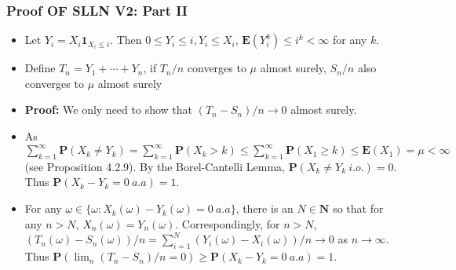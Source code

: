 \documentclass[handout]{beamer}
\newcommand{\BP}{\mathbf{P}}
\newcommand{\BE}{\mathbf{E}}
\newcommand{\BI}{\mathbf{1}}
\begin{document}
\frame
{
  \frametitle{Proof OF SLLN V2: Part II}

   \begin{itemize}
   \item<1-> Let $Y_i=X_i \BI_{X_i\leq i}$. Then $0\leq Y_i\leq i, Y_i\leq X_i$, $\BE(Y_i^k) \leq i^k< \infty$ for any $k$.
   
    \item<2->[]\begin{Lemma} Define $T_n=Y_1+\cdots+Y_n$, if $T_n/n$ converges to $\mu$ almost surely, $S_n/n$ also converges to $\mu$ almost surely \end{Lemma} 
    
    \item<3-> \textbf{Proof:} We only need to show that $(T_n-S_n)/n \rightarrow 0$ almost surely. 
    
         \item<4->[-]  As $\sum_{k=1}^{\infty} \BP(X_k\neq Y_k)=\sum_{k=1}^{\infty} \BP (X_k>k) \leq \sum_{k=1}^{\infty} \BP (X_1\geq k)\leq \BE(X_1)=\mu<\infty$ (see Proposition 4.2.9). By the Borel-Cantelli Lemma, $\BP(X_k\neq Y_k\ i.o.)=0$. Thus $\BP(X_k-Y_k=0\ a.a)=1$.
         
         \item<5->[-]   For any $\omega\in \{\omega: X_k(\omega)-Y_k(\omega)=0\ a.a \}$, there is an $N \in \mathbf{N}$ so that for any $n>N$, $X_n(\omega)=Y_n(\omega)$. Correspondingly, for $n>N$, $(T_n(\omega)-S_n(\omega))/n=\sum_{i=1}^N (Y_i(\omega)-X_i (\omega) )/n \rightarrow 0$ as $n\rightarrow \infty$.  Thus $\BP (\lim_n (T_n-S_n)/n=0)\geq \BP(X_k-Y_k=0\ a.a)=1$.
                                      
\end{itemize}
}
\end{document}

